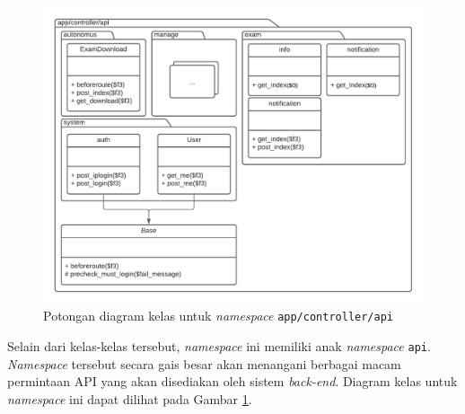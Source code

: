     \begin{figure}
        \centering
        \includegraphics[width=0.75\paperwidth]{Gambar/classmap-be/Classmap - app-controller-api.pdf}
        \caption{Potongan diagram kelas untuk \textit{namespace} \texttt{app/controller/api}}
        \label{fig:classmap_app-controller-api}
    \end{figure}
    
    Selain dari kelas-kelas tersebut, \textit{namespace} ini memiliki anak \textit{namespace}
    \texttt{api}. \textit{Namespace} tersebut secara gais besar akan menangani berbagai macam
    permintaan API yang akan disediakan oleh sistem \textit{back-end}. Diagram kelas untuk
    \textit{namespace} ini dapat dilihat pada Gambar \ref{fig:classmap_app-controller-api}.
    
